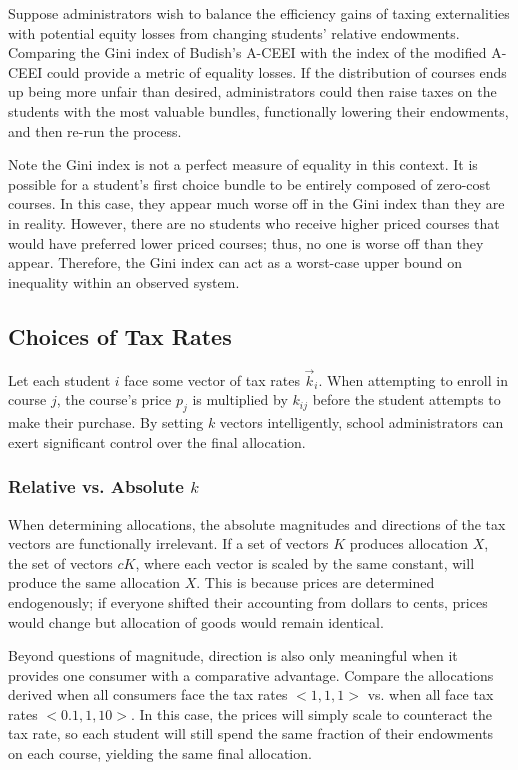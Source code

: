 \documentclass{article}
\begin{document}
Suppose administrators wish to balance the efficiency gains of taxing externalities with potential equity losses from changing students' relative endowments. Comparing the Gini index of Budish's A-CEEI with the index of the modified A-CEEI could provide a metric of equality losses. If the distribution of courses ends up being more unfair than desired, administrators could then raise taxes on the students with the most valuable bundles, functionally lowering their endowments, and then re-run the process.

Note the Gini index is not a perfect measure of equality in this context. It is possible for a student's first choice bundle to be entirely composed of zero-cost courses. In this case, they appear much worse off in the Gini index than they are in reality. However, there are no students who receive higher priced courses that would have preferred lower priced courses; thus, no one is worse off than they appear. Therefore, the Gini index can act as a worst-case upper bound on inequality within an observed system.



\subsection{Choices of Tax Rates}
\label{choices}

Let each student $i$ face some vector of tax rates $\vec{k}_i$. When attempting to enroll in course $j$, the course's price $p_j$ is multiplied by $k_{ij}$ before the student attempts to make their purchase. By setting $k$ vectors intelligently, school administrators can exert significant control over the final allocation.

\subsubsection{Relative vs. Absolute $k$}

When determining allocations, the absolute magnitudes and directions of the tax vectors are functionally irrelevant. If a set of vectors $K$ produces allocation $X$, the set of vectors $cK$, where each vector is scaled by the same constant, will produce the same allocation $X$. This is because prices are determined endogenously; if everyone shifted their accounting from dollars to cents, prices would change but allocation of goods would remain identical.

Beyond questions of magnitude, direction is also only meaningful when it provides one consumer with a comparative advantage. Compare the allocations derived when all consumers face the tax rates $<1, 1, 1>$ vs. when all face tax rates $<0.1, 1, 10>$. In this case, the prices will simply scale to counteract the tax rate, so each student will still spend the same fraction of their endowments on each course, yielding the same final allocation.
\end{document}
